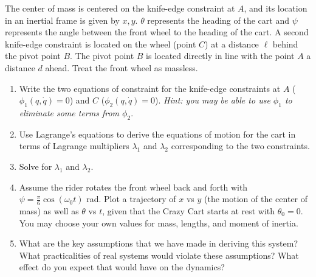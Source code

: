 \documentclass{article}
\begin{document}
The center of mass is centered on the knife-edge constraint at \(A\), and its location in an inertial frame is given by \(x, y\). \(\theta\) represents the heading of the cart and \(\psi\) represents the angle between the front wheel to the heading of the cart. A second knife-edge constraint is located on the wheel (point \(C\)) at a distance \(\ell\) behind the pivot point \(B\). The pivot point \(B\) is located directly in line with the point \(A\) a distance \(d\) ahead. Treat the front wheel as massless.

\begin{enumerate}[label=\alph*.]
\item Write the two equations of constraint for the knife-edge constraints at \(A\) (\(\phi_1(q, \dot{q})=0\)) and \(C\) (\(\phi_2(q, \dot{q})=0\)). \textit{Hint: you may be able to use \(\phi_1\) to eliminate some terms from \(\phi_2\)}.

\item Use Lagrange's equations to derive the equations of motion for the cart in terms of Lagrange multipliers \(\lambda_1\) and \(\lambda_2\) corresponding to the two constraints.

\item Solve for \(\lambda_1\) and \(\lambda_2\).

\item Assume the rider rotates the front wheel back and forth with \(\psi=\frac{\pi}{6}\cos(\omega_0t)\) rad. Plot a trajectory of \(x\) vs \(y\) (the motion of the center of mass) as well as \(\theta\) vs \(t\), given that the Crazy Cart starts at rest with \(\theta_0=0\). You may choose your own values for mass, lengths, and moment of inertia.

\item What are the key assumptions that we have made in deriving this system? What practicalities of real systems would violate these assumptions? What effect do you expect that would have on the dynamics?
\end{enumerate}

\hline \vspace{10pt}
\end{document}
